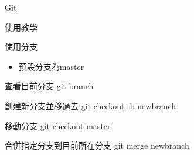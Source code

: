 \documentclass[pdf,16pt]{beamer}
\begin{document}
\begin{section}{Git}
\begin{subsection}{使用教學}
      \begin{frame}{使用分支}
        \begin{itemize}
          \item 預設分支為master
        \end{itemize}
        \begin{block}{查看目前分支}
          git branch
        \end{block}
        \begin{block}{創建新分支並移過去}
          git checkout -b newbranch
        \end{block}
        \begin{block}{移動分支}
          git checkout master
        \end{block}
        \begin{block}{合併指定分支到目前所在分支}
          git merge newbranch
        \end{block}
        
      \end{frame}
      
    \end{subsection}
   \end{section}
   
\end{document}
